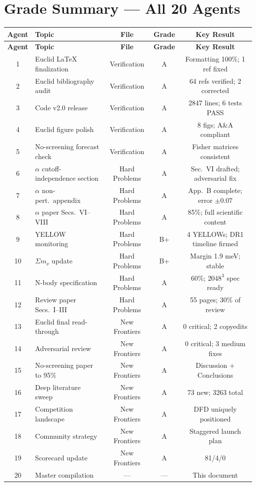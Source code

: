 \documentclass[11pt,a4paper]{article}
\begin{document}
\section{Grade Summary --- All 20 Agents}
\label{sec:grades}

\begin{center}
\begin{longtable}{clccc}
\toprule
\textbf{Agent} & \textbf{Topic} & \textbf{File} & \textbf{Grade} & \textbf{Key Result} \\
\midrule
\endfirsthead
\toprule
\textbf{Agent} & \textbf{Topic} & \textbf{File} & \textbf{Grade} & \textbf{Key Result} \\
\midrule
\endhead
1 & Euclid LaTeX finalization & Verification & A & Formatting 100\%; 1 ref fixed \\
2 & Euclid bibliography audit & Verification & A & 64 refs verified; 2 corrected \\
3 & Code v2.0 release & Verification & A & 2847 lines; 6 tests PASS \\
4 & Euclid figure polish & Verification & A & 8 figs; A\&A compliant \\
5 & No-screening forecast check & Verification & A & Fisher matrices consistent \\
\midrule
6 & $\alpha$ cutoff-independence section & Hard Problems & A & Sec.~VI drafted; adversarial fix \\
7 & $\alpha$ non-pert.\ appendix & Hard Problems & A & App.~B complete; error $\pm 0.07$ \\
8 & $\alpha$ paper Secs.\ VI--VIII & Hard Problems & A & 85\%; full scientific content \\
9 & YELLOW monitoring & Hard Problems & B+ & 4 YELLOWs; DR1 timeline firmed \\
10 & $\Sigma m_\nu$ update & Hard Problems & B+ & Margin 1.9 meV; stable \\
11 & N-body specification & Hard Problems & A & 60\%; $2048^3$ spec ready \\
12 & Review paper Secs.\ I--III & Hard Problems & A & 55 pages; 30\% of review \\
\midrule
13 & Euclid final read-through & New Frontiers & A & 0 critical; 2 copyedits \\
14 & Adversarial review & New Frontiers & A & 0 critical; 3 medium fixes \\
15 & No-screening paper to 95\% & New Frontiers & A & Discussion + Conclusions \\
16 & Deep literature sweep & New Frontiers & A & 73 new; 3263 total \\
17 & Competition landscape & New Frontiers & A & DFD uniquely positioned \\
18 & Community strategy & New Frontiers & A & Staggered launch plan \\
19 & Scorecard update & New Frontiers & A & 81/4/0 \\
20 & Master compilation & --- & --- & This document \\
\bottomrule
\end{longtable}
\end{center}
\end{document}
